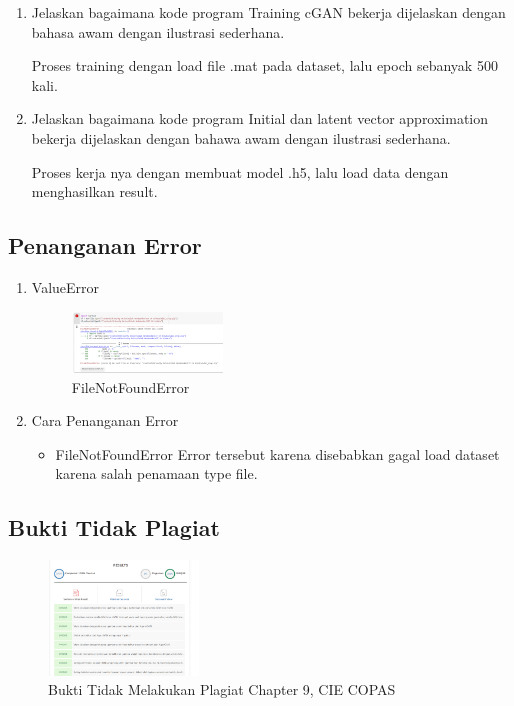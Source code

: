 \begin{enumerate}
	\item Jelaskan bagaimana kode program Training cGAN bekerja dijelaskan dengan bahasa awam dengan ilustrasi sederhana.
	\hfill\break
	
	Proses training dengan load file .mat pada dataset, lalu epoch sebanyak 500 kali.

	\item Jelaskan bagaimana kode program Initial dan latent vector approximation bekerja dijelaskan dengan bahawa awam dengan ilustrasi sederhana.
	\hfill\break
	
	Proses kerja nya dengan membuat model .h5, lalu load data dengan menghasilkan result.
	
\end{enumerate}

\subsection{Penanganan Error}
\begin{enumerate}
	\item ValueError
	\begin{figure}[H]
		\includegraphics[width=4cm]{figures/1174021/tugas9/error/1.PNG}
		\centering
		\caption{FileNotFoundError}
	\end{figure}

	\item Cara Penanganan Error
	\begin{itemize}
		\item FileNotFoundError
		\hfill\break
		Error tersebut karena disebabkan gagal load dataset karena salah penamaan type file.
	\end{itemize}
\end{enumerate}

\subsection{Bukti Tidak Plagiat}
\begin{figure}[H]
\centering
	\includegraphics[width=4cm]{figures/1174021/tugas9/buktiplagiat/1.PNG}
	\caption{Bukti Tidak Melakukan Plagiat Chapter 9, CIE COPAS}
\end{figure}

